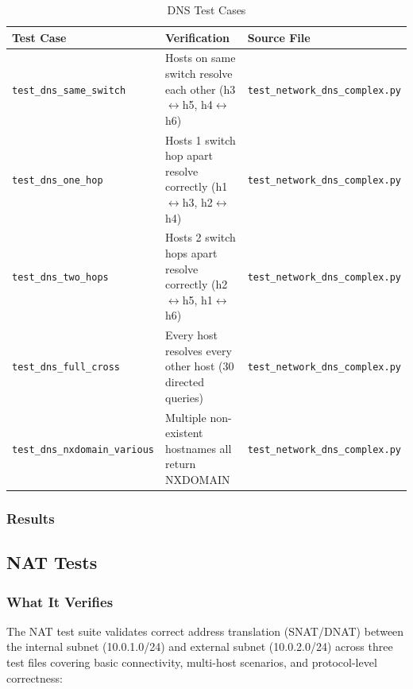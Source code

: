 \documentclass[12pt,a4paper]{article}
\begin{document}
\begin{table}[H]
\centering
\begin{tabular}{@{}p{5cm}p{4.5cm}p{4cm}@{}}
\toprule
\textbf{Test Case} & \textbf{Verification} & \textbf{Source File} \\
\midrule
\texttt{test\_dns\_same\_switch} & Hosts on same switch resolve each other (h3$\leftrightarrow$h5, h4$\leftrightarrow$h6) & \texttt{test\_network\_dns\_complex.py} \\
\texttt{test\_dns\_one\_hop} & Hosts 1 switch hop apart resolve correctly (h1$\leftrightarrow$h3, h2$\leftrightarrow$h4) & \texttt{test\_network\_dns\_complex.py} \\
\texttt{test\_dns\_two\_hops} & Hosts 2 switch hops apart resolve correctly (h2$\leftrightarrow$h5, h1$\leftrightarrow$h6) & \texttt{test\_network\_dns\_complex.py} \\
\texttt{test\_dns\_full\_cross} & Every host resolves every other host (30 directed queries) & \texttt{test\_network\_dns\_complex.py} \\
\texttt{test\_dns\_nxdomain\_various} & Multiple non-existent hostnames all return NXDOMAIN & \texttt{test\_network\_dns\_complex.py} \\
\bottomrule
\end{tabular}
\caption{DNS Test Cases}
\end{table}

\subsubsection{Results}

\begin{center}
\end{center}

\subsection{NAT Tests}

\subsubsection{What It Verifies}

The NAT test suite validates correct address translation (SNAT/DNAT) between the internal subnet (10.0.1.0/24) and external subnet (10.0.2.0/24) across three test files covering basic connectivity, multi-host scenarios, and protocol-level correctness:
\end{document}
